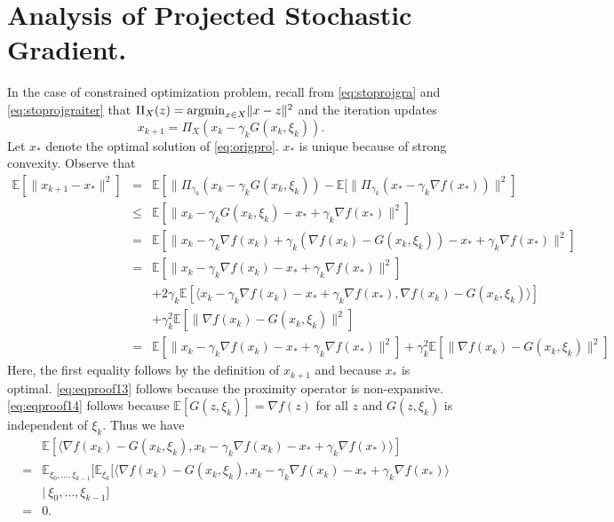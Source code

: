 \section{Analysis of Projected Stochastic Gradient.}
In the case of constrained optimization problem, recall from \eqref{eq:stoprojgra} and \eqref{eq:stoprojgraiter} that $\Pi_X (z) ={\rm argmin}_{x\in X} \|x - z\|^2$ and the iteration updates
\begin{equation}
x_{k+1}=\Pi_X (x_k-\gamma_k G(x_k, \xi_k)).
\end{equation}
Let $x_*$ denote the optimal solution of \eqref{eq:origpro}. $x_*$ is unique because of strong convexity. Observe that
\begin{eqnarray}
\mathbb{E}[\|x_{k+1}-x_*\|^2]&=&\mathbb{E}\left[\|\Pi_{\gamma_k} (x_{k}-\gamma_k G(x_k,\xi_k))-\mathbb{E}[\|\Pi_{\gamma_k}(x_*-\gamma_k \nabla f(x_*))\|^2\right]  \nonumber \\
&\leq&\mathbb{E}[\|x_{k}-\gamma_k G(x_k,\xi_k)-x_*+\gamma_k \nabla f(x_*)\|^2]  \label{eq:eqproof13} \\
&=&\mathbb{E}[\|x_{k}-\gamma_k \nabla f(x_k)+\gamma_k (\nabla f(x_k)-G(x_k,\xi_k))-x_*+\gamma_k \nabla f(x_*)\|^2]  \label{eq:eqproof14} \\
&=& \mathbb{E}\left[ \| x_k -\gamma_k \nabla f(x_k) - x_* +\gamma_k \nabla f(x_*)\|^2\right]  \\
&& +2\gamma_k\mathbb{E}[\langle x_k- \gamma_k \nabla f(x_k) - x_* + \gamma_k \nabla f(x_*), \nabla f(x_k)-G(x_k,\xi_k)\rangle ] \nonumber \\
&&+\gamma_k^2 \mathbb{E}[\|\nabla f(x_k) - G(x_k,\xi_k)\|^2] \nonumber \\
&=&\mathbb{E}[\|x_{k}-\gamma_k \nabla f(x_k)-x_*+\gamma_k \nabla f(x_*)\|^2]+ \gamma_k^2 \mathbb{E}[\|\nabla f(x_k)-G(x_k,\xi_k)\|^2] \label{eq:eqnproof15} 
\end{eqnarray}
Here, the first equality follows by the definition of $x_{k+1}$ and because $x_*$ is optimal. \eqref{eq:eqproof13} follows because the proximity operator is non-expansive. \eqref{eq:eqproof14} follows because $\mathbb{E}[G(z,\xi_k)] = \nabla f(z)$ for all $z$ and $G(z,\xi_k)$ is independent of $\xi_k$. Thus we have
\begin{eqnarray}
&&\mathbb{E}[\langle \nabla f(x_k)-G(x_k,\xi_k), x_k-\gamma_k\nabla f(x_k)-x_*+\gamma_k \nabla f(x_*) \rangle] \\
&=& \mathbb{E}_{\xi_0,\ldots,\xi_{k-1}}[\mathbb{E}_{\xi_k}[\langle \nabla f(x_k)-G(x_k,\xi_k), x_k-\gamma_k\nabla f(x_k)-x_*+\gamma_k \nabla f(x_*) \rangle \\
 && |\ \xi_0,\ldots,\xi_{k-1}] \nonumber\\
&=& 0.
\end{eqnarray}

